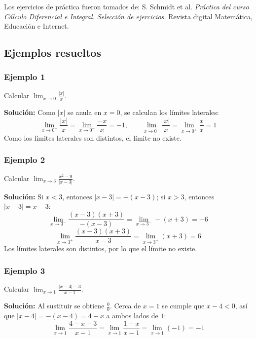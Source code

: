 \documentclass[12pt]{article}
\begin{document}
Los ejercicios de práctica fueron tomados de: S. Schmidt et al. \textit{Práctica del curso Cálculo Diferencial e Integral. Selección de ejercicios.} Revista digital Matemática, Educación e Internet.



\subsection{Ejemplos resueltos}

\subsubsection{Ejemplo 1}


Calcular $\displaystyle \lim_{x \to 0} \frac{|x|}{x}$.

\textbf{Solución:} Como $|x|$ se anula en $x = 0$, se calculan los límites laterales:
\[
\lim_{x \to 0^-} \frac{|x|}{x} = \lim_{x \to 0^-} \frac{-x}{x} = -1, \qquad
\lim_{x \to 0^+} \frac{|x|}{x} = \lim_{x \to 0^+} \frac{x}{x} = 1
\]
Como los límites laterales son distintos, el límite no existe.



\subsubsection{Ejemplo 2}


Calcular $\displaystyle \lim_{x \to 3} \frac{x^2 - 9}{|x - 3|}$.

\textbf{Solución:} Si $x < 3$, entonces $|x - 3| = -(x - 3)$; si $x > 3$, entonces $|x - 3| = x - 3$:
\[
\lim_{x \to 3^-} \frac{(x - 3)(x + 3)}{-(x - 3)} = \lim_{x \to 3^-} -(x + 3) = -6
\]
\[
\lim_{x \to 3^+} \frac{(x - 3)(x + 3)}{x - 3} = \lim_{x \to 3^+} (x + 3) = 6
\]
Los límites laterales son distintos, por lo que el límite no existe.



\subsubsection{Ejemplo 3}


Calcular $\displaystyle \lim_{x \to 1} \frac{|x - 4| - 3}{x - 1}$.

\textbf{Solución:} Al sustituir se obtiene $\frac{0}{0}$. Cerca de $x = 1$ se cumple que $x - 4 < 0$, así que $|x - 4| = -(x - 4) = 4 - x$ a ambos lados de $1$:
\[
\lim_{x \to 1} \frac{4 - x - 3}{x - 1} = \lim_{x \to 1} \frac{1 - x}{x - 1} = \lim_{x \to 1} (-1) = -1
\]
\end{document}
